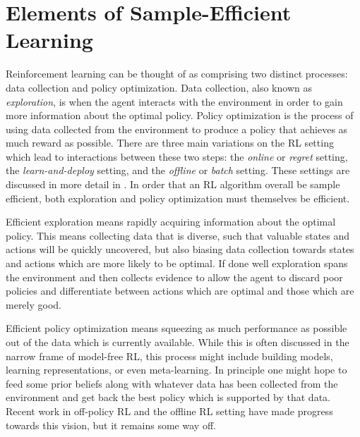 




\section{Elements of Sample-Efficient Learning}

Reinforcement learning can be thought of as comprising two distinct processes: data collection and policy optimization.
Data collection, also known as \emph{exploration}, is when the agent interacts with the environment in order to gain more information about the optimal policy.
Policy optimization is the process of using data collected from the environment to produce a policy that achieves as much reward as possible.
There are three main variations on the RL setting which lead to interactions between these two steps: the \emph{online} or \emph{regret} setting, the \emph{learn-and-deploy} setting, and the \emph{offline} or \emph{batch} setting.
These settings are discussed in more detail in .
In order that an RL algorithm overall be sample efficient, both exploration and policy optimization must themselves be efficient.

Efficient exploration means rapidly acquiring information about the optimal policy.
This means collecting data that is diverse, such that valuable states and actions will be quickly uncovered, but also biasing data collection towards states and actions which are more likely to be optimal.
If done well exploration spans the environment and then collects evidence to allow the agent to discard poor policies and differentiate between actions which are optimal and those which are merely good.

Efficient policy optimization means squeezing as much performance as possible out of the data which is currently available.
While this is often discussed in the narrow frame of model-free RL, this process might include building models, learning representations, or even meta-learning.
In principle one might hope to feed some prior beliefs along with whatever data has been collected from the environment and get back the best policy which is supported by that data.
Recent work in off-policy RL and the offline RL setting have made progress towards this vision, but it remains some way off.



